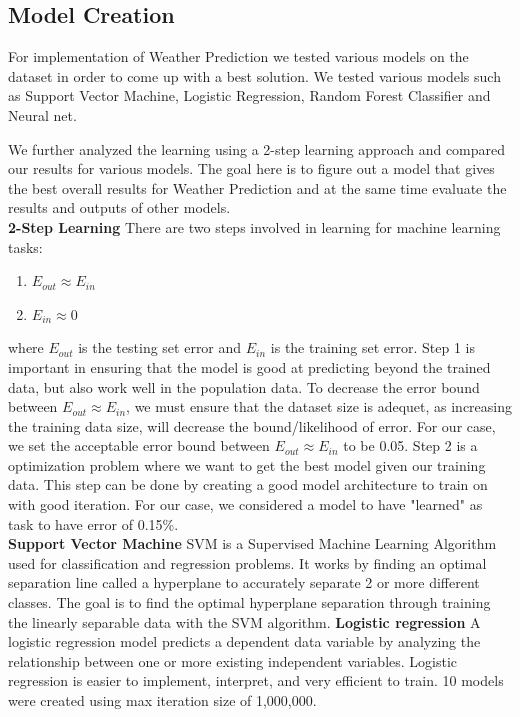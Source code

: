 \documentclass[conference]{IEEEtran}
\begin{document}
\subsection{Model Creation}
For implementation of Weather Prediction we tested various models on the dataset in order to come up with a best solution. We tested various models such as Support Vector Machine, Logistic Regression, Random Forest Classifier and Neural net. 

We further analyzed the learning using a 2-step learning approach and compared our results for various models. The goal here is to figure out a model that gives the best overall results for Weather Prediction and at the same time evaluate the results and outputs of other models. \\ \textbf{2-Step Learning}
There are two steps involved in learning for machine learning tasks:
\begin{enumerate}
\item $E_{out} \approx E_{in}$
\item $E_{in} \approx 0$
\end{enumerate}
where $E_{out}$ is the testing set error and $E_{in}$ is the training set error. Step 1 is important in ensuring that the model is good at predicting beyond the trained data, but also work well in the population data. To decrease the error bound between $E_{out} \approx E_{in}$, we must ensure that the dataset size is adequet, as increasing the training data size, will decrease the bound/likelihood of error. For our case, we set the acceptable error bound between $E_{out} \approx E_{in}$ to be 0.05. Step 2 is a optimization problem where we want to get the best model given our training data. This step can be done by creating a good model architecture to train on with good iteration. For our case, we considered a model to have "learned" as task to have error of 0.15\%.\\\textbf{Support Vector Machine}
SVM is a Supervised Machine Learning Algorithm used for classification and regression problems. It works by finding an optimal separation line called a hyperplane to accurately separate 2 or more different classes. The goal is to find the optimal hyperplane separation through training the linearly separable data with the SVM algorithm.
\textbf{Logistic regression}
A logistic regression model predicts a dependent data variable by analyzing the relationship between one or more existing independent variables. Logistic regression is easier to implement, interpret, and very efficient to train. 10 models were created using max iteration size of 1,000,000.
\end{document}
